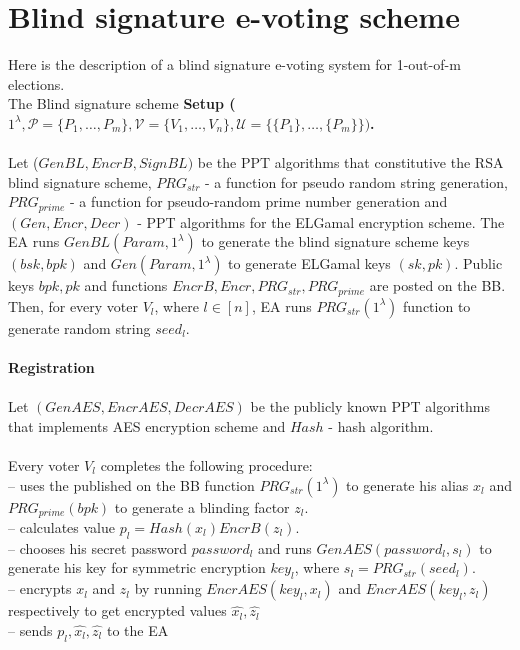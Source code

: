 \documentclass[12pt]{article}
\begin{document}
\section {Blind signature e-voting scheme}
Here is the description of a blind signature e-voting system for 1-out-of-m elections.\\
The Blind signature scheme 
\textbf{Setup ($1^{\lambda}, \mathcal{P} = \{P_1,\dots,P_m\}, \mathcal{V} = \{V_1,\dots,V_n\}, \mathcal{U} =  \{\{P_1\},\dots,\{P_m\}\})$.}\\\\
Let ($GenBL, EncrB, SignBL)$ be the PPT algorithms that constitutive the RSA blind signature scheme,  $PRG_{str}$  - a function for pseudo random string generation, $PRG_{prime}$  - a function for pseudo-random prime number generation and $(Gen, Encr, Decr)$ - PPT algorithms for the ELGamal encryption scheme. The EA runs $GenBL(Param, 1^{\lambda})$ to generate the blind signature scheme keys $(bsk, bpk)$ and $Gen(Param, 1^{\lambda})$ to generate ELGamal keys $(sk,pk)$. Public keys $bpk,pk$ and functions $EncrB,Encr, PRG_{str}, PRG_{prime}$ are posted on the BB.\\
Then, for every voter $V_l$, where $l \in [n]$, EA runs $PRG_{str}(1^{\lambda})$ function to generate random string $seed_l$.\\\\
\textbf{Registration}\\\\
Let $(GenAES, EncrAES, DecrAES)$ be the publicly known PPT algorithms that implements AES encryption scheme and $Hash$ - hash algorithm.  \\\\
Every voter $V_l$ completes the following procedure: \\
--  uses the published on the BB function $PRG_{str}(1^{\lambda})$ to generate his alias $x_l$ and  $PRG_{prime}(bpk)$ to generate a blinding factor $z_l$. \\
-- calculates value $p_l = Hash(x_l)EncrB(z_l)$.\\
--  chooses his secret password $password_l$ and runs  $ GenAES(password_l, s_l)$ to generate his key for symmetric encryption $key_l$, where $s_l = PRG_{str}(seed_l)$.\\
--  encrypts $x_l$ and $z_l$ by running  $EncrAES(key_l,x_l)$ and $EncrAES(key_l,z_l)$ respectively to get encrypted values $\hat{x_l},\hat{z_l}$\\
-- sends $p_l,\hat{x_l},\hat{z_l}$ to the EA\\\\
\end{document}
